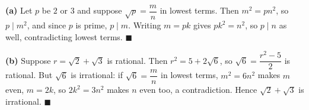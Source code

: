 \textbf{(a)} Let $p$ be $2$ or $3$ and suppose $\sqrt p=\dfrac mn$ in lowest terms. Then $m^2=pn^2$, so $p\mid m^2$, and since $p$ is prime, $p\mid m$. Writing $m=pk$ gives $pk^2=n^2$, so $p\mid n$ as well, contradicting lowest terms. $\blacksquare$

\textbf{(b)} Suppose $r=\sqrt2+\sqrt3$ is rational. Then $r^2=5+2\sqrt6$, so $\sqrt6=\dfrac{r^2-5}{2}$ is rational. But $\sqrt6$ is irrational: if $\sqrt6=\dfrac mn$ in lowest terms, $m^2=6n^2$ makes $m$ even, $m=2k$, so $2k^2=3n^2$ makes $n$ even too, a contradiction. Hence $\sqrt2+\sqrt3$ is irrational. $\blacksquare$
